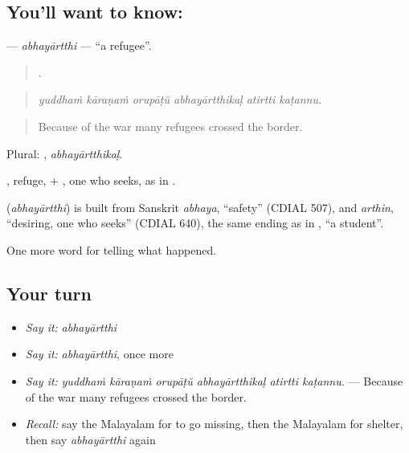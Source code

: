 \subsection*{You'll want to know: }
\textbf{} — \emph{abhayārtthi} — \textquotedblleft{}a refugee\textquotedblright{}.

\begin{quote}
     .
\end{quote}

\begin{quote}
\emph{yuddhaṁ kāraṇaṁ orupāṭŭ abhayārtthikaḷ atirtti kaṭannu.}
\end{quote}

\begin{quote}
Because of the war many refugees crossed the border.
\end{quote}

Plural: , \emph{abhayārtthikaḷ}.

, refuge, + , one who seeks, as in .

\begin{cousinweb}
\textbf{} (\emph{abhayārtthi}) is built from Sanskrit \emph{abhaya}, \textquotedblleft{}safety\textquotedblright{} (CDIAL 507), and \emph{arthin}, \textquotedblleft{}desiring, one who seeks\textquotedblright{} (CDIAL 640), the same ending as in , \textquotedblleft{}a student\textquotedblright{}.
\end{cousinweb}

\begin{grammarlens}[title={What you've built}]
One more word for telling what happened.
\end{grammarlens}

\subsection*{Your turn}
\begin{itemize}
\raggedright
  \item \emph{Say it:} \emph{abhayārtthi}
  \item \emph{Say it:} \emph{abhayārtthi}, once more
  \item \emph{Say it:} \emph{yuddhaṁ kāraṇaṁ orupāṭŭ abhayārtthikaḷ atirtti kaṭannu.} — Because of the war many refugees crossed the border.
  \item \emph{Recall:} say the Malayalam for to go missing, then the Malayalam for shelter, then say \emph{abhayārtthi} again
\end{itemize}

